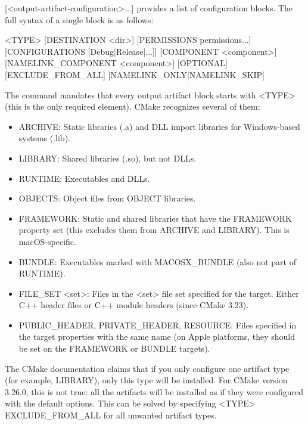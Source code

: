 [<output-artifact-configuration>...] provides a list of configuration blocks. The full syntax of a single block is as follows:

\begin{shell}
<TYPE> [DESTINATION <dir>]
       [PERMISSIONS permissions...]
       [CONFIGURATIONS [Debug|Release|...]]
       [COMPONENT <component>]
       [NAMELINK_COMPONENT <component>]
       [OPTIONAL] [EXCLUDE_FROM_ALL]
       [NAMELINK_ONLY|NAMELINK_SKIP]
\end{shell}

The command mandates that every output artifact block starts with <TYPE> (this is the only required element). CMake recognizes several of them:

\begin{itemize}
\item
ARCHIVE: Static libraries (.a) and DLL import libraries for Windows-based systems (.lib).

\item
LIBRARY: Shared libraries (.so), but not DLLs.

\item
RUNTIME: Executables and DLLs.

\item
OBJECTS: Object files from OBJECT libraries.

\item
FRAMEWORK: Static and shared libraries that have the FRAMEWORK property set (this excludes them from ARCHIVE and LIBRARY). This is macOS-specific.

\item
BUNDLE: Executables marked with MACOSX\_BUNDLE (also not part of RUNTIME).

\item
FILE\_SET <set>: Files in the <set> file set specified for the target. Either C++ header files or C++ module headers (since CMake 3.23).

\item
PUBLIC\_HEADER, PRIVATE\_HEADER, RESOURCE: Files specified in the target properties with the same name (on Apple platforms, they should be set on the FRAMEWORK or BUNDLE targets).
\end{itemize}

The CMake documentation claims that if you only configure one artifact type (for example, LIBRARY), only this type will be installed. For CMake version 3.26.0, this is not true: all the artifacts will be installed as if they were configured with the default options. This can be solved by specifying <TYPE> EXCLUDE\_FROM\_ALL for all unwanted artifact types.

